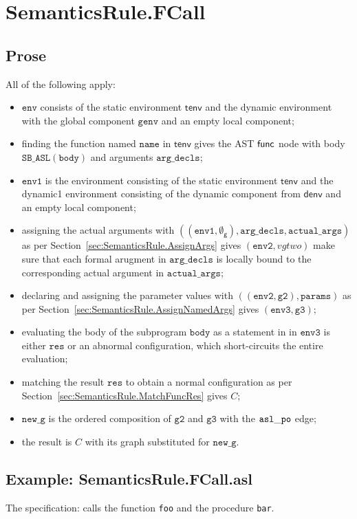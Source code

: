 \documentclass{book}
\newcommand\secref[1]{Section~\ref{sec:#1}}
\newcommand\xgraph[0]{\textsf{g}}
\newcommand\emptygraph[0]{{\emptyset}_\xgraph}
\newcommand\tenv[0]{\textsf{tenv}}
\newcommand\denv[0]{\textsf{denv}}
\newcommand\ProseOrAbnormal[0]{or an abnormal configuration, which short-circuits the entire evaluation}
\newcommand\env[0]{\texttt{env}}
\newcommand\envone[0]{\texttt{env1}}
\newcommand\envtwo[0]{\texttt{env2}}
\newcommand\envthree[0]{\texttt{env3}}
\newcommand\newg[0]{\texttt{new\_g}}
\newcommand\vres[0]{\texttt{res}}
\newcommand\vgtwo[0]{\texttt{g2}}
\newcommand\vgthree[0]{\texttt{g3}}
\newcommand\name[0]{\texttt{name}}
\newcommand\actualargs[0]{\texttt{actual\_args}}
\newcommand\argdecls[0]{\texttt{arg\_decls}}
\newcommand\params[0]{\texttt{params}}
\newcommand\vbody[0]{\texttt{body}}
\newcommand\genv[0]{\texttt{genv}}
\begin{document}

\section{SemanticsRule.FCall \label{sec:SemanticsRule.FCall}}
  \subsection{Prose}
  All of the following apply:
  \begin{itemize}
    \item $\env$ consists of the static environment $\tenv$ and the dynamic environment with the global
    component $\genv$ and an empty local component;
    \item finding the function named $\name$ in $\tenv$ gives the AST $\textsf{func}$ node with body
    $\texttt{SB\_ASL}(\vbody)$ and arguments $\argdecls$;
    \item $\envone$ is the environment consisting of the static environment $\tenv$ and the dynamic1
    environment consisting of the dynamic component from $\denv$ and an empty local component;
    \item assigning the actual arguments with $((\envone, \emptygraph), \argdecls, \actualargs)$
    as per \secref{SemanticsRule.AssignArgs} gives $(\envtwo, vgtwo)$ make sure that each
    formal arugment in $\argdecls$ is
    locally bound to the corresponding actual argument in $\actualargs$;
    \item declaring and assigning the parameter values with $((\envtwo, \vgtwo), \params)$
    as per \secref{SemanticsRule.AssignNamedArgs} gives $(\envthree, \vgthree)$;
    \item evaluating the body of the subprogram $\vbody$ as a statement in in $\envthree$
    is either $\vres$ \ProseOrAbnormal;
    \item matching the result $\vres$ to obtain a normal configuration as per \secref{SemanticsRule.MatchFuncRes}
    gives $C$;
    \item $\newg$ is the ordered composition of $\vgtwo$ and $\vgthree$ with the $\mathtt{asl\_po}$ edge;
    \item the result is $C$ with its graph substituted for $\newg$.
  \end{itemize}

  \subsection{Example: SemanticsRule.FCall.asl}
  The specification:
  calls the function \texttt{foo} and the procedure \texttt{bar}.
\end{document}
